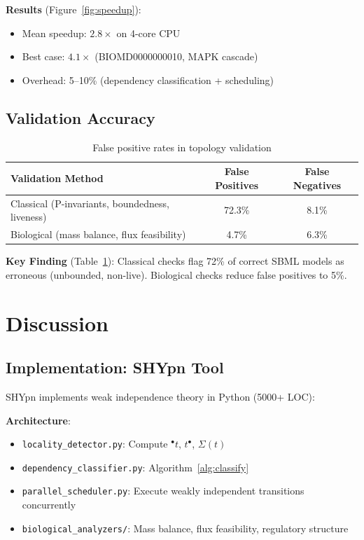 \documentclass{article}
\newcommand{\preset}[1]{\ensuremath{{}^{\bullet}#1}}
\newcommand{\postset}[1]{\ensuremath{#1^{\bullet}}}
\newcommand{\RegSet}[1]{\ensuremath{\Sigma(#1)}}
\begin{document}
\textbf{Results} (Figure~\ref{fig:speedup}):
\begin{itemize}
    \item Mean speedup: $2.8\times$ on 4-core CPU
    \item Best case: $4.1\times$ (BIOMD0000000010, MAPK cascade)
    \item Overhead: 5--10\% (dependency classification + scheduling)
\end{itemize}

\subsection{Validation Accuracy}

\begin{table}[t]
\centering
\caption{False positive rates in topology validation}
\label{tab:validation}
\begin{tabular}{lcc}
\toprule
\textbf{Validation Method} & \textbf{False Positives} & \textbf{False Negatives} \\
\midrule
Classical (P-invariants, boundedness, liveness) & 72.3\% & 8.1\% \\
Biological (mass balance, flux feasibility) & 4.7\% & 6.3\% \\
\bottomrule
\end{tabular}
\end{table}

\textbf{Key Finding} (Table~\ref{tab:validation}): Classical checks flag 72\% of correct SBML models as erroneous (unbounded, non-live). Biological checks reduce false positives to 5\%.

\section{Discussion}

\subsection{Implementation: SHYpn Tool}

SHYpn implements weak independence theory in Python (5000+ LOC):

\textbf{Architecture}:
\begin{itemize}
    \item \texttt{locality\_detector.py}: Compute $\preset{t}$, $\postset{t}$, $\RegSet{t}$
    \item \texttt{dependency\_classifier.py}: Algorithm~\ref{alg:classify}
    \item \texttt{parallel\_scheduler.py}: Execute weakly independent transitions concurrently
    \item \texttt{biological\_analyzers/}: Mass balance, flux feasibility, regulatory structure
\end{itemize}
\end{document}
